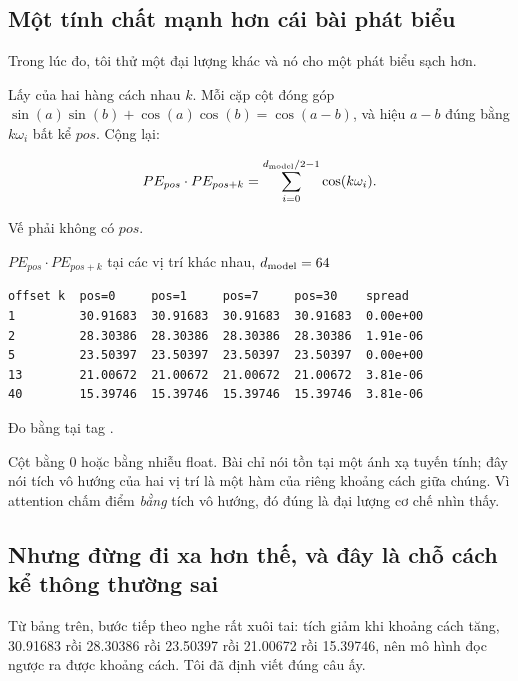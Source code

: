 \subsection*{Một tính chất mạnh hơn cái bài phát biểu}

%
Trong lúc đo, tôi thử một đại lượng khác và nó cho một phát biểu sạch hơn.

Lấy  của hai hàng cách nhau \(k\). Mỗi cặp cột
đóng góp
\(\sin(a)\sin(b) + \cos(a)\cos(b) = \cos(a - b)\), và hiệu \(a - b\) đúng bằng
\(k\omega_i\) bất kể \(pos\). Cộng lại:

\begin{equation}
  PE_{pos} \cdot PE_{pos+k} = \sum_{i=0}^{d_{\mathrm{model}}/2 - 1} \cos(k \omega_i).
  \label{eq:ch07-tich-vo-huong-pe}
\end{equation}

Vế phải không có \(pos\).

\begin{measured}{\(PE_{pos} \cdot PE_{pos+k}\) tại các vị trí khác nhau, \(d_{\mathrm{model}} = 64\)}
\begin{verbatim}
offset k  pos=0     pos=1     pos=7     pos=30    spread
1         30.91683  30.91683  30.91683  30.91683  0.00e+00
2         28.30386  28.30386  28.30386  28.30386  1.91e-06
5         23.50397  23.50397  23.50397  23.50397  0.00e+00
13        21.00672  21.00672  21.00672  21.00672  3.81e-06
40        15.39746  15.39746  15.39746  15.39746  3.81e-06
\end{verbatim}

Đo bằng  tại tag .
\end{measured}

Cột  bằng 0 hoặc bằng nhiễu float. Bài chỉ nói tồn tại một ánh xạ
tuyến tính; đây nói tích vô hướng của hai vị trí là một hàm của riêng khoảng
cách giữa chúng. Vì attention chấm điểm \emph{bằng} tích vô hướng, đó đúng là
đại lượng cơ chế nhìn thấy.

\subsection*{Nhưng đừng đi xa hơn thế, và đây là chỗ cách kể thông thường sai}

%
Từ bảng trên, bước tiếp theo nghe rất xuôi tai: tích giảm khi khoảng cách tăng,
30.91683 rồi 28.30386 rồi 23.50397 rồi 21.00672 rồi 15.39746, nên mô hình đọc
ngược ra được khoảng cách. Tôi đã định viết đúng câu ấy.

